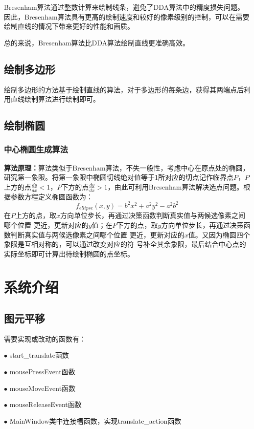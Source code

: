 \documentclass[a4paper,UTF8]{article}
\theoremstyle{definition}
\begin{document}
Bresenham算法通过整数计算来绘制线条，避免了DDA算法中的精度损失问题。因此，Bresenham算法具有更高的绘制速度和较好的像素级别的控制，可以在需要绘制直线的情况下带来更好的性能和画质。

总的来说，Bresenham算法比DDA算法绘制直线更准确高效。

\subsection{绘制多边形}

绘制多边形的方法基于绘制直线的算法，对于多边形的每条边，获得其两端点后利用直线绘制算法进行绘制即可。

\subsection{绘制椭圆}

\subsubsection{中心椭圆生成算法}

\textbf{算法原理：}算法类似于Bresenham算法，不失一般性，考虑中心在原点处的椭圆，研究第一象限。将第一象限中椭圆切线绝对值等于1所对应的切点记作临界点$P$，$P$上方的点$\frac{dy}{dx}<1$，$P$下方的点$\frac{dy}{dx}>1$，由此可利用Bresenham算法解决选点问题。根据参数方程定义椭圆函数为：
$$f_{ellipse}(x,y)=b^2x^2+a^2y^2-a^2b^2$$
在$P$上方的点，取$x$方向单位步长，再通过决策函数判断真实值与两候选像素之间哪个位置
更近，更新对应的$y$值；在$P$下方的点，取$y$方向单位步长，再通过决策函数判断真实值与两候选像素之间哪个位置
更近，更新对应的$x$值。又因为椭圆四个象限是互相对称的，可以通过改变对应的符
号补全其余象限，最后结合中心点的实际坐标即可计算出待绘制椭圆的点坐标。
\section{系统介绍}

\subsection{图元平移}

需要实现或改动的函数有：

$\bullet$ start\_translate函数

$\bullet$ mousePressEvent函数

$\bullet$ mouseMoveEvent函数

$\bullet$ mouseReleaseEvent函数

$\bullet$ MainWindow类中连接槽函数，实现translate\_action函数
\end{document}
